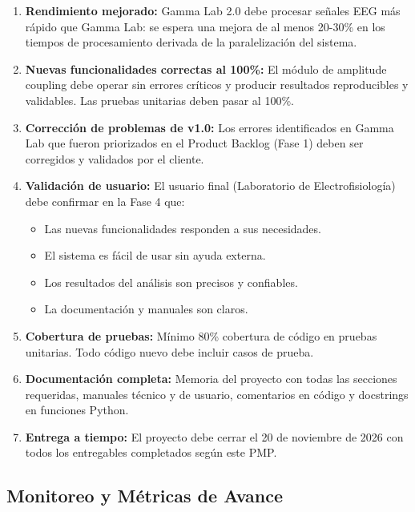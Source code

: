 \documentclass{article}
\begin{document}
\begin{enumerate}
    \item \textbf{Rendimiento mejorado:} Gamma Lab 2.0 debe procesar señales EEG más rápido que Gamma Lab: se espera una mejora de al menos 20-30\% en los tiempos de procesamiento derivada de la paralelización del sistema.
    
    \item \textbf{Nuevas funcionalidades correctas al 100\%:} El módulo de amplitude coupling debe operar sin errores críticos y producir resultados reproducibles y validables. Las pruebas unitarias deben pasar al 100\%.
    
    \item \textbf{Corrección de problemas de v1.0:} Los errores identificados en Gamma Lab que fueron priorizados en el Product Backlog (Fase 1) deben ser corregidos y validados por el cliente.
    
    \item \textbf{Validación de usuario:} El usuario final (Laboratorio de Electrofisiología) debe confirmar en la Fase 4 que:
    \begin{itemize}
        \item Las nuevas funcionalidades responden a sus necesidades.
        \item El sistema es fácil de usar sin ayuda externa.
        \item Los resultados del análisis son precisos y confiables.
        \item La documentación y manuales son claros.
    \end{itemize}
    
    \item \textbf{Cobertura de pruebas:} Mínimo 80\% cobertura de código en pruebas unitarias. Todo código nuevo debe incluir casos de prueba.
    
    \item \textbf{Documentación completa:} Memoria del proyecto con todas las secciones requeridas, manuales técnico y de usuario, comentarios en código y docstrings en funciones Python.
    
    \item \textbf{Entrega a tiempo:} El proyecto debe cerrar el 20 de noviembre de 2026 con todos los entregables completados según este PMP.
\end{enumerate}

\subsection{Monitoreo y Métricas de Avance}
\end{document}
